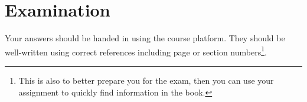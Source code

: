 \section{Examination}
\label{sec:Examination}
Your answers should be handed in using the course platform.
They should be well-written using correct references including page or section 
numbers\footnote{%
	This is also to better prepare you for the exam, then you can use your 
	assignment to quickly find information in the book.
}.
